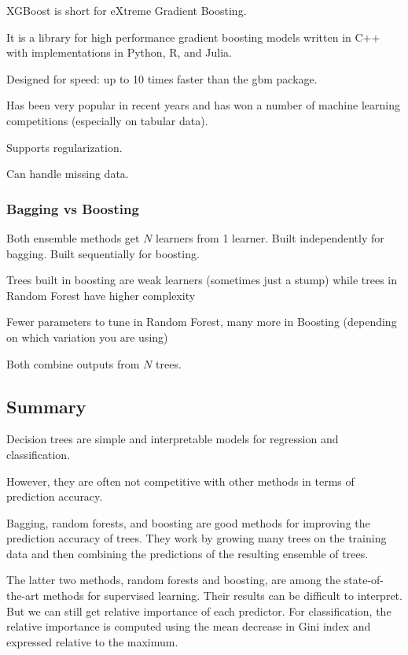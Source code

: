 \indent 

XGBoost is short for eXtreme Gradient Boosting.

It is a library for high performance gradient boosting models written in C++ with implementations in Python, R, and Julia.

Designed for speed: up to 10 times faster than the gbm package.

Has been very popular in recent years and has won a number of machine learning competitions (especially on tabular data).

Supports regularization.

Can handle missing data.

\subsubsection{Bagging vs Boosting}

\indent 

Both ensemble methods get $N$ learners from 1 learner. Built independently for bagging. Built sequentially for boosting.

Trees built in boosting are weak learners (sometimes just a stump) while trees in Random Forest have higher complexity

Fewer parameters to tune in Random Forest, many more in Boosting (depending on which variation you are using)

Both combine outputs from $N$ trees.

\subsection{Summary}

\indent 

Decision trees are simple and interpretable models for regression and classification.

However, they are often not competitive with other methods in terms of prediction accuracy.

Bagging, random forests, and boosting are good methods for improving the prediction accuracy of trees. They work by growing many trees on the training data and then combining the predictions of the resulting ensemble of trees.

The latter two methods, random forests and boosting, are among the state-of-the-art methods for supervised learning. Their results can be difficult to interpret. But we can still get relative importance of each predictor. For classification, the relative importance is computed using the mean decrease in Gini index and expressed relative to the maximum.